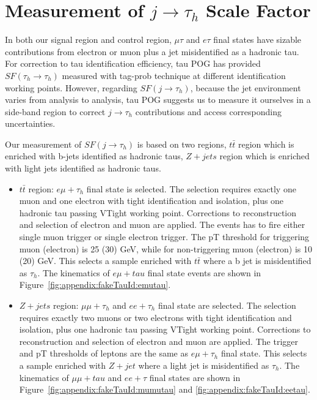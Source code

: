 

\section{Measurement of \texorpdfstring{$j \to \tau_h$}{Lg} Scale Factor}


In both our signal region and control region, $\mu \tau$ and $e \tau$
final states have sizable contributions from electron or muon plus a jet
misidentified as a hadronic tau.  For correction to tau identification
efficiency, tau POG has provided $SF (\tau_h \to \tau_h)$ measured with
tag-prob technique at different identification working points.  However,
regarding $SF (j \to \tau_h)$, because the jet environment varies from
analysis to analysis, tau POG suggests us to measure it ourselves in a
side-band region to correct $j \to \tau_h$ contributions and access
corresponding uncertainties.

Our measurement of $SF (j\to \tau_h)$ is based on two regions,
$t\bar{t}$ region which is enriched with b-jets identified as hadronic
taus, $Z+jets$ region which is enriched with light jets identified as
hadronic taus.

\begin{itemize}
    \item $t\bar{t}$ region: $e\mu+\tau_h$ final state is selected. The selection requires
    exactly one muon and one electron with tight identification and
    isolation, plus one hadronic tau passing VTight working point.
    Corrections to reconstruction and selection of electron and muon are
    applied.
    The events has to fire either single muon trigger or single electron
    trigger.  The pT threshold for triggering muon (electron) is 25 (30)
    GeV, while for non-triggering muon (electron) is 10 (20) GeV.  This
    selects a sample enriched with $t\bar{t}$ where a b jet is
    misidentified as $\tau_h$. The kinematics of $e\mu+tau$ final
    state events are shown in Figure~\ref{fig:appendix:fakeTauId:emutau}.
    
    
    \item $Z+jets$ region: $\mu\mu+\tau_h$ and $ee+\tau_h$ final state are selected.  The
    selection requires exactly two muons or two electrons with tight
    identification and isolation, plus one hadronic tau passing VTight
    working point.  Corrections to reconstruction and selection of
    electron and muon are applied.
    The trigger and pT thresholds of leptons are the same as
    $e\mu+\tau_h$ final state.  This selects a sample enriched with $Z +
    jet$ where a light jet is misidentified as $\tau_h$. The kinematics of $\mu\mu+tau$ and
    $ee+\tau$ final states are shown in Figure~\ref{fig:appendix:fakeTauId:mumutau} and \ref{fig:appendix:fakeTauId:eetau}.
\end{itemize}


